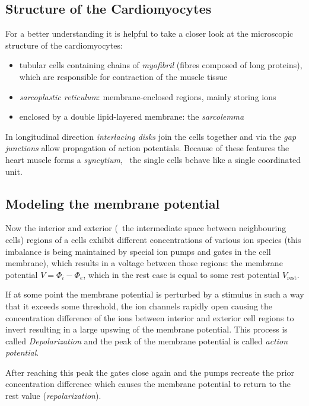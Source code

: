 \subsection{Structure of the Cardiomyocytes}
For a better understanding it is helpful to take a closer look at the
microscopic structure of the cardiomyocytes:
\begin{itemize}
    \item
        tubular cells containing chains of \emph{myofibril} (fibres composed
        of long proteins), which are responsible for contraction of the
        muscle tissue

    \item
        \emph{sarcoplastic reticulum}: membrane-enclosed regions, mainly
        storing  ions

    \item
        enclosed by a double lipid-layered membrane: the \emph{sarcolemma}
\end{itemize}
In longitudinal direction \emph{interlacing disks} join the cells together
and via the \emph{gap junctions} allow propagation of action potentials.
Because of these features the heart muscle forms a \emph{syncytium}, \ie~the
single cells behave like a single coordinated unit.


\subsection{Modeling the membrane potential}
Now the interior and exterior (\ie~the intermediate space between
neighbouring cells) regions of a cells exhibit different concentrations of
various ion species (this imbalance is being maintained by special ion
pumps and gates in the cell membrane), which results in a voltage between
those regions: the membrane potential $V=\Phi_i-\Phi_e$, which in the rest
case is equal to some rest potential $V_{\mathrm{rest}}$.

If at some point the membrane potential is perturbed by a stimulus in such
a way that it exceeds some threshold, the ion channels rapidly open causing
the concentration difference of the ions between interior and exterior
cell regions to invert resulting in a large upswing of the membrane
potential. This process is called \emph{Depolarization} and the peak of the
membrane potential is called \emph{action potential}.

After reaching this peak the gates close again and the pumps recreate the
prior concentration difference which causes the membrane potential to
return to the rest value (\emph{repolarization}).

